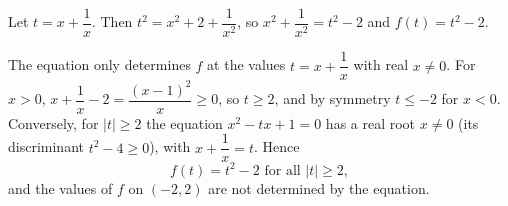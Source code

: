 Let $t=x+\dfrac1x$. Then $t^2=x^2+2+\dfrac1{x^2}$, so $x^2+\dfrac{1}{x^2}=t^2-2$ and $f(t)=t^2-2$.

The equation only determines $f$ at the values $t=x+\dfrac1x$ with real $x\ne0$. For $x>0$, $x+\dfrac1x-2=\dfrac{(x-1)^2}{x}\ge0$, so $t\ge2$, and by symmetry $t\le-2$ for $x<0$. Conversely, for $|t|\ge2$ the equation $x^2-tx+1=0$ has a real root $x\ne0$ (its discriminant $t^2-4\ge0$), with $x+\dfrac1x=t$. Hence
\[\boxed{f(t)=t^2-2\text{ for all }|t|\ge2},\]
and the values of $f$ on $(-2,2)$ are not determined by the equation.

